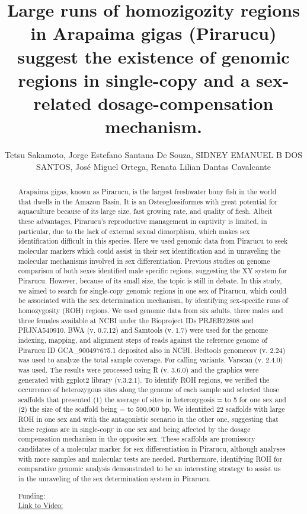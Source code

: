 \documentclass[twoside]{article}
\title{\vspace{-15mm}\fontsize{24pt}{10pt}\selectfont\textbf{ Large runs of homozigozity regions in Arapaima gigas (Pirarucu) suggest the existence of genomic regions in single-copy and a sex-related dosage-compensation mechanism. }} %
\author{ Tetsu Sakamoto,  Jorge Estefano Santana De Souza,  SIDNEY EMANUEL B DOS SANTOS,  Jos\'e Miguel Ortega,  Renata Lilian Dantas Cavalcante }
\affil{ UNIVERSIDADE FEDERAL DE MINAS GERAIS,  UNIVERSIDADE FEDERAL DO RIO GRANDE DO NORTE,  UNIVERSIDADE FEDERAL DO PAR\'A }
\date{}
\begin{document}
  
  
  \maketitle %
  
  
  \thispagestyle{fancy} %
  
  
  \begin{abstract}
  Arapaima gigas,  known as Pirarucu,  is the largest freshwater bony fish in the world that dwells in the Amazon Basin. It is an Osteoglossiformes with great potential for aquaculture because of its large size,  fast growing rate,  and quality of flesh. Albeit these advantages,  Pirarucu’s reproductive management in captivity is limited,  in particular,  due to the lack of external sexual dimorphism,  which makes sex identification difficult in this species. Here we used genomic data from Pirarucu to seek molecular markers which could assist in their sex identification and in unraveling the molecular mechanisms involved in sex differentiation. Previous studies on genome comparison of both sexes identified male specific regions,  suggesting the XY system for Pirarucu. However,  because of its small size,  the topic is still in debate. In this study,  we aimed to search for single-copy genomic regions in one sex of Pirarucu,  which could be associated with the sex determination mechanism,  by identifying sex-specific runs of homozygosity (ROH) regions. We used genomic data from six adults,  three males and three females available at NCBI under the Bioproject IDs PRJEB22808 and PRJNA540910. BWA (v. 0.7.12) and Samtools (v. 1.7) were used for the genome indexing,  mapping,  and alignment steps of reads against the reference genome of Pirarucu ID GCA\_900497675.1 deposited also in NCBI. Bedtools genomecov (v. 2.24) was used to analyze the total sample coverage. For calling variants,  Varscan (v. 2.4.0) was used. The results were processed using R (v. 3.6.0) and the graphics were generated with ggplot2 library (v.3.2.1). To identify ROH regions,  we verified the occurrence of heterozygous sites along the genome of each sample and selected those scaffolds that presented (1) the average of sites in heterozygosis = to 5 for one sex and (2) the size of the scaffold being = to 500.000 bp. We identified 22 scaffolds with large ROH in one sex and with the antagonistic scenario in the other one,  suggesting that these regions are in single-copy in one sex and being affected by the dosage compensation mechanism in the opposite sex. These scaffolds are promissory candidates of a molecular marker for sex differentiation in Pirarucu,  although analyses with more samples and molecular tests are needed. Furthermore,  identifying ROH for comparative genomic analysis demonstrated to be an interesting strategy to assist us in the unraveling of the sex determination system in Pirarucu.
  
  Funding:  \\
  \href{http://ab3c.org.br/xpress_pres2020/xmxp2020-305296.html}{Link to Video:}

  \end{abstract}
   
  
\end{document}
